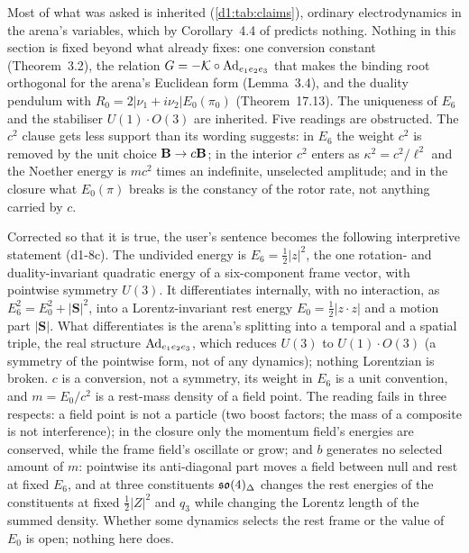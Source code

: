 Most of what was asked is inherited (\cref{d1:tab:claims}), ordinary electrodynamics in the arena's variables, which by Corollary~4.4 of \cite{ES17}
predicts nothing. Nothing in this section is fixed beyond what \cite{ES17} already fixes: one conversion constant (Theorem~3.2), the relation
$G=-\mathcal K\circ\operatorname{Ad}_{e_1e_2e_3}$ that makes the binding root orthogonal for the arena's Euclidean form (Lemma~3.4), and the duality pendulum with
$R_0=2|\nu_1+i\nu_2|E_0(\pi_0)$ (Theorem~17.13). The uniqueness of $E_6$ and the stabiliser $U(1)\cdot O(3)$ are inherited. Five readings are
obstructed. The $c^2$ clause gets less support than its wording suggests: in $E_6$ the weight $c^2$ is removed by the unit choice $\mathbf B\to c\mathbf B$; in the
interior $c^2$ enters as $\kappa^2=c^2/\ell^2$ and the Noether energy is $mc^2$ times an indefinite, unselected amplitude; and in the closure what $E_0(\pi)$
breaks is the constancy of the rotor rate, not anything carried by $c$.

Corrected so that it is true, the user's sentence becomes the following interpretive statement (d1-8c). The undivided energy is $E_6=\tfrac12|z|^2$,
the one rotation- and duality-invariant quadratic energy of a six-component frame vector, with pointwise symmetry $U(3)$. It differentiates internally,
with no interaction, as $E_6^2=E_0^2+|\mathbf S|^2$, into a Lorentz-invariant rest energy $E_0=\tfrac12|z\cdot z|$ and a motion part $|\mathbf S|$. What
differentiates is the arena's splitting into a temporal and a spatial triple, the real structure $\operatorname{Ad}_{e_1e_2e_3}$, which reduces $U(3)$ to
$U(1)\cdot O(3)$ (a symmetry of the pointwise form, not of any dynamics); nothing Lorentzian is broken. $c$ is a conversion, not a symmetry, its weight
in $E_6$ is a unit convention, and $m=E_0/c^2$ is a rest-mass density of a field point. The reading fails in three respects: a field point is not a
particle (two boost factors; the mass of a composite is not interference); in the closure only the momentum field's energies are conserved, while the
frame field's oscillate or grow; and $b$ generates no selected amount of $m$: pointwise its anti-diagonal part moves a field between null and rest at
fixed $E_6$, and at three constituents $\mathfrak{so}(4)_\Delta$ changes the rest energies of the constituents at fixed $\tfrac12|Z|^2$ and $q_3$ while changing the Lorentz
length of the summed density. Whether some dynamics selects the rest frame or the value of $E_0$ is open; nothing here does.

